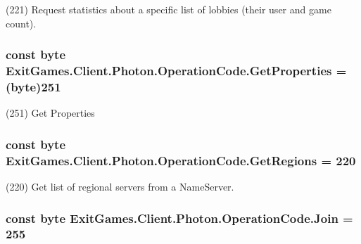 (221) Request statistics about a specific list of lobbies (their user and game count).

\subsubsection[{\texorpdfstring{Get\+Properties}{GetProperties}}]{\setlength{\rightskip}{0pt plus 5cm}const byte Exit\+Games.\+Client.\+Photon.\+Operation\+Code.\+Get\+Properties = (byte)251}\hypertarget{class_exit_games_1_1_client_1_1_photon_1_1_operation_code_a7bfd447d57b228deb49cf59b9d442047}{}\label{class_exit_games_1_1_client_1_1_photon_1_1_operation_code_a7bfd447d57b228deb49cf59b9d442047}


(251) Get Properties

\subsubsection[{\texorpdfstring{Get\+Regions}{GetRegions}}]{\setlength{\rightskip}{0pt plus 5cm}const byte Exit\+Games.\+Client.\+Photon.\+Operation\+Code.\+Get\+Regions = 220}\hypertarget{class_exit_games_1_1_client_1_1_photon_1_1_operation_code_a47ec5b6ce3097f6c31a440d679a39bd5}{}\label{class_exit_games_1_1_client_1_1_photon_1_1_operation_code_a47ec5b6ce3097f6c31a440d679a39bd5}


(220) Get list of regional servers from a Name\+Server.

\subsubsection[{\texorpdfstring{Join}{Join}}]{\setlength{\rightskip}{0pt plus 5cm}const byte Exit\+Games.\+Client.\+Photon.\+Operation\+Code.\+Join = 255}\hypertarget{class_exit_games_1_1_client_1_1_photon_1_1_operation_code_ab40167d42ef70df40f89864db5085c68}{}\label{class_exit_games_1_1_client_1_1_photon_1_1_operation_code_ab40167d42ef70df40f89864db5085c68}


